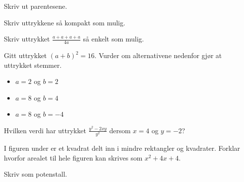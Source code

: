 
Skriv ut parentesene. \os
{}

\newpage
{}
Skriv uttrykkene så kompakt som mulig. \os
{}

Skriv uttrykket $\frac{a+a+a+a}{4a}$  så enkelt som mulig.


 \vs
{}






\nes

Gitt uttrykket $ {(a+b)^2=16} $.
Vurder om alternativene nedenfor gjør at uttrykket stemmer.
\begin{itemize}
	\item $ a=2 $ og $ b=2 $
	\item $ a=8 $ og $ b=4 $
	\item $ a=8 $ og $ b=-4 $
\end{itemize}

Hvilken verdi har uttrykket $ \frac{y^2-2xy}{y^2} $ dersom ${ x = 4} $ og $ {y = -2}$?

I figuren under er et kvadrat delt inn i mindre rektangler og kvadrater. Forklar hvorfor arealet til hele figuren kan skrives som $x^2 + 4x + 4$.

Skriv som potenstall. \os
{} \vsk

